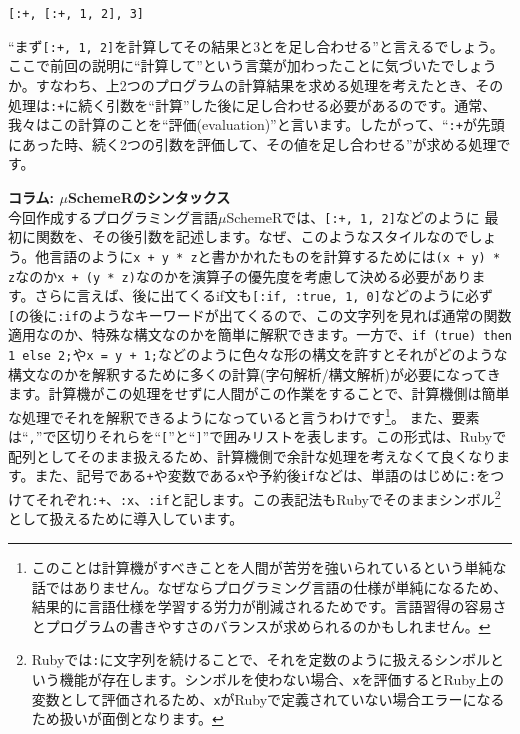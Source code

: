 \begin{lstlisting}
[:+, [:+, 1, 2], 3]
\end{lstlisting}

“まず{\tt [:+, 1, 2]}を計算してその結果と3とを足し合わせる”と言えるでしょう。ここで前回の説明に“計算して”という言葉が加わったことに気づいたでしょうか。すなわち、上2つのプログラムの計算結果を求める処理を考えたとき、その処理は{\tt :+}に続く引数を“計算”した後に足し合わせる必要があるのです。通常、我々はこの計算のことを“評価(evaluation)”と言います。したがって、“{\tt :+}が先頭にあった時、続く2つの引数を評価して、その値を足し合わせる”が求める処理です。

\begin{boxnote}
{\bf コラム: $\mu$SchemeRのシンタックス} \\

今回作成するプログラミング言語$\mu$SchemeRでは、{\tt [:+, 1, 2]}などのように
最初に関数を、その後引数を記述します。なぜ、このようなスタイルなのでしょう。他言語のように{\tt x + y * z}と書かかれたものを計算するためには{\tt (x + y) * z}なのか{\tt x + (y * z)}なのかを演算子の優先度を考慮して決める必要があります。さらに言えば、後に出てくるif文も{\tt [:if, :true,  1, 0]}などのように必ず{\tt [}の後に{\tt :if}のようなキーワードが出てくるので、この文字列を見れば通常の関数適用なのか、特殊な構文なのかを簡単に解釈できます。一方で、{\tt if (true) then 1 else 2;}や{\tt x = y + 1;}などのように色々な形の構文を許すとそれがどのような構文なのかを解釈するために多くの計算(字句解析/構文解析)が必要になってきます。計算機がこの処理をせずに人間がこの作業をすることで、計算機側は簡単な処理でそれを解釈できるようになっていると言うわけです\footnote{このことは計算機がすべきことを人間が苦労を強いられているという単純な話ではありません。なぜならプログラミング言語の仕様が単純になるため、結果的に言語仕様を学習する労力が削減されるためです。言語習得の容易さとプログラムの書きやすさのバランスが求められるのかもしれません。}。
また、要素は“{\tt ,}”で区切りそれらを“{\tt [}”と“{\tt ]}”で囲みリストを表します。この形式は、Rubyで配列としてそのまま扱えるため、計算機側で余計な処理を考えなくて良くなります。また、記号である{\tt +}や変数である{\tt x}や予約後{\tt if}などは、単語のはじめに{\tt :}をつけてそれぞれ{\tt :+}、{\tt :x}、{\tt :if}と記します。この表記法もRubyでそのままシンボル\footnote{Rubyでは{\tt :}に文字列を続けることで、それを定数のように扱えるシンボルという機能が存在します。シンボルを使わない場合、{\tt x}を評価するとRuby上の変数として評価されるため、{\tt x}がRubyで定義されていない場合エラーになるため扱いが面倒となります。}として扱えるために導入しています。
\end{boxnote}

